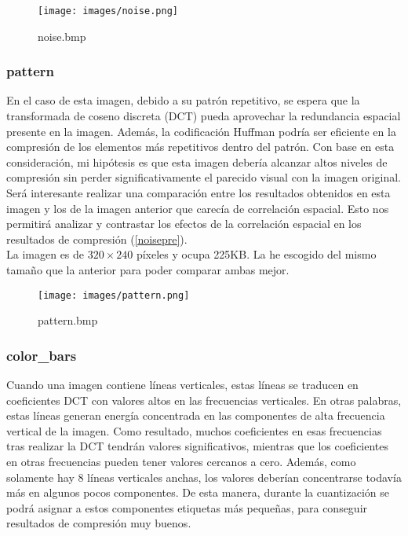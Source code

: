 \documentclass[12pt,a4paper]{article}
\begin{document}
\begin{figure}[H]
    \centering
    \texttt{[image: images/noise.png]}
    \caption{noise.bmp}
    
\end{figure}

\break
\subsubsection{pattern}
En el caso de esta imagen, debido a su patrón repetitivo, se espera que la transformada de coseno discreta (DCT) pueda aprovechar la redundancia espacial presente en la imagen. Además, la codificación Huffman podría ser eficiente en la compresión de los elementos más repetitivos dentro del patrón. Con base en esta consideración, mi hipótesis es que esta imagen debería alcanzar altos niveles de compresión sin perder significativamente el parecido visual con la imagen original.\\

Será interesante realizar una comparación entre los resultados obtenidos en esta imagen y los de la imagen anterior que carecía de correlación espacial. Esto nos permitirá analizar y contrastar los efectos de la correlación espacial en los resultados de compresión (\ref{noisepre}).\\

La imagen es de $320\times240$ píxeles y ocupa 225KB. La he escogido del mismo tamaño que la anterior para poder comparar ambas mejor.\\

\begin{figure}[H]
    \centering
    \texttt{[image: images/pattern.png]}
    \caption{pattern.bmp}
    
\end{figure}

\break
\subsubsection{color\_bars}
Cuando una imagen contiene líneas verticales, estas líneas se traducen en coeficientes DCT con valores altos en las frecuencias verticales. En otras palabras, estas líneas generan energía concentrada en las componentes de alta frecuencia vertical de la imagen. Como resultado, muchos coeficientes en esas frecuencias tras realizar la DCT tendrán valores significativos, mientras que los coeficientes en otras frecuencias pueden tener valores cercanos a cero. Además, como solamente hay 8 líneas verticales anchas, los valores deberían concentrarse todavía más en algunos pocos componentes. De esta manera, durante la cuantización se podrá asignar a estos componentes etiquetas más pequeñas, para conseguir resultados de compresión muy buenos.\\
\end{document}
